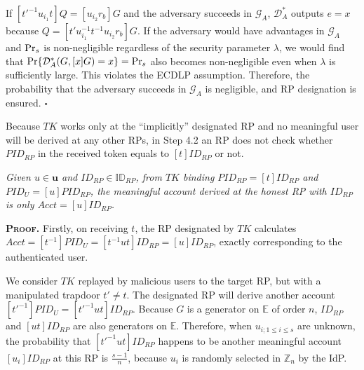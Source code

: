 If $[t'^{-1}u_{i_1}t]Q = [u_{i_2}r_{b}]G$ and the adversary succeeds in $\mathcal{G}_A$, $\mathcal{D}^*_A$ outputs $e =x$
 because $Q = [t'u_{i_1}^{-1}t^{-1}u_{i_2}r_{b}]G$.
If the adversary would have advantages  in $\mathcal{G}_A$ and ${\rm Pr}_s$ is non-negligible regardless of the security parameter $\lambda$,
    we would find that ${\rm Pr}\{\mathcal{D}^*_A(G, [x]G)=x\}= {\rm Pr}_s$ also becomes non-negligible even when $\lambda$ is sufficiently large.
This violates the ECDLP assumption.
Therefore, the probability that the adversary succeeds in $\mathcal{G}_A$ is negligible,
    and RP designation is ensured.
\hfill $\square$
\vspace{.75mm}

Because $TK$ works only at the ``implicitly'' designated RP and
    no meaningful user will be derived at any other RPs, %
 in Step 4.2 an RP does not check whether $PID_{RP}$ in the received token equals to $[t]ID_{RP}$ or not.


\vspace{-1.2mm}
\begin{thm} \emph{Given $u \in \mathbf{u}$ and $ID_{RP} \in \mathbb{ID}_{RP}$,
from $TK$ binding $PID_{RP}=[t]ID_{RP}$ and $PID_U = [u]PID_{RP}$,
 the meaningful account derived at the honest RP with $ID_{RP}$ 
 is only $Acct = [u]ID_{RP}$.}\label{thm-user-id}
\end{thm}
\vspace{-1.2mm}

\noindent\textbf{\textsc{Proof.}}
Firstly, on receiving $t$,
the RP designated by $TK$ calculates $Acct = [t^{-1}]PID_{U} =[t^{-1}ut]ID_{RP} = [u]ID_{RP}$,
    exactly corresponding to the authenticated user.

We consider $TK$ replayed by malicious users to the target RP, but with a manipulated trapdoor $t' \neq t$.
The designated RP will derive another account $[t'^{-1}]PID_U = [t'^{-1}ut]ID_{RP}$.
Because $G$ is a generator on $\mathbb{E}$ of order $n$, $ID_{RP}$ and $[ut]ID_{RP}$ are also generators on $\mathbb{E}$.
Therefore, when $u_{i; 1\leq i \leq s}$ are unknown, the probability that $[t'^{-1}ut]ID_{RP}$ happens to be another meaningful account $[u_i]ID_{RP}$ at this RP is $\frac{s-1}{n}$,
because $u_i$ is randomly selected in $\mathbb{Z}_n$ by the IdP.

